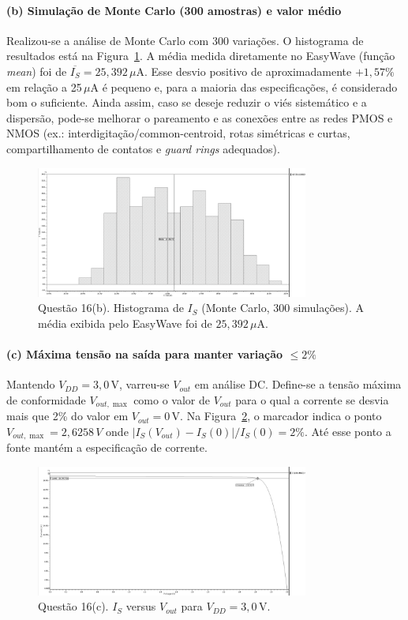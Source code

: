 \documentclass[12pt,a4paper]{article}
\begin{document}
\paragraph{(b) Simulação de Monte Carlo (300 amostras) e valor médio}
Realizou-se a análise de Monte Carlo com 300 variações. O histograma de resultados está na Figura~\ref{fig:q16b}. A média medida diretamente no EasyWave (função \emph{mean}) foi de $\overline{I_S}=25{,}392\,\mu$A. Esse desvio positivo de aproximadamente $+1{,}57\%$ em relação a 25\,$\mu$A é pequeno e, para a maioria das especificações, é considerado bom o suficiente. Ainda assim, caso se deseje reduzir o viés sistemático e a dispersão, pode-se melhorar o pareamento e as conexões entre as redes PMOS e NMOS (ex.: interdigitação/common-centroid, rotas simétricas e curtas, compartilhamento de contatos e \textit{guard rings} adequados).

\begin{figure}[H]
    \centering
    \includegraphics[width=0.8\textwidth]{images/16.2.png}
    \caption{Questão 16(b). Histograma de $I_S$ (Monte Carlo, 300 simulações). A média exibida pelo EasyWave foi de $25{,}392\,\mu$A.}
    \label{fig:q16b}
\end{figure}

\paragraph{(c) Máxima tensão na saída para manter variação $\leq 2\%$}
Mantendo $V_{DD}=3{,}0$\,V, varreu-se $V_{out}$ em análise DC. Define-se a tensão máxima de conformidade $V_{out,\max}$ como o valor de $V_{out}$ para o qual a corrente se desvia mais que 2\% do valor em $V_{out}=0$\,V. Na Figura~\ref{fig:q16c}, o marcador indica o ponto $V_{out,\max} = 2,6258\,V$ onde $\left|I_S(V_{out})-I_S(0)\right|/I_S(0)=2\%$. Até esse ponto a fonte mantém a especificação de corrente.

\begin{figure}[H]
    \centering
    \includegraphics[width=0.8\textwidth]{images/16.3.png}
    \caption{Questão 16(c). $I_S$ versus $V_{out}$ para $V_{DD}=3{,}0$\,V.}
    \label{fig:q16c}
\end{figure}
\end{document}
